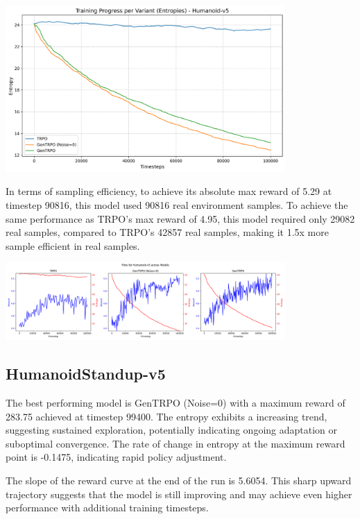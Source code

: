 \documentclass{svproc}
\begin{document}
\begin{center}
\includegraphics[width=0.8\textwidth]{graph_entropies_Humanoid-v5.png}
\end{center}

In terms of sampling efficiency, to achieve its absolute max reward of 5.29 at timestep 90816, this model used 90816 real environment samples. To achieve the same performance as TRPO's max reward of 4.95, this model required only 29082 real samples, compared to TRPO's 42857 real samples, making it 1.5x more sample efficient in real samples.

\begin{center}
\includegraphics[width=0.8\textwidth]{grid_env_Humanoid-v5.png}
\end{center}

\subsection{HumanoidStandup-v5}
The best performing model is GenTRPO (Noise=0) with a maximum reward of 283.75 achieved at timestep 99400. The entropy exhibits a increasing trend, suggesting sustained exploration, potentially indicating ongoing adaptation or suboptimal convergence. The rate of change in entropy at the maximum reward point is -0.1475, indicating rapid policy adjustment.

The slope of the reward curve at the end of the run is 5.6054. This sharp upward trajectory suggests that the model is still improving and may achieve even higher performance with additional training timesteps.
\end{document}
